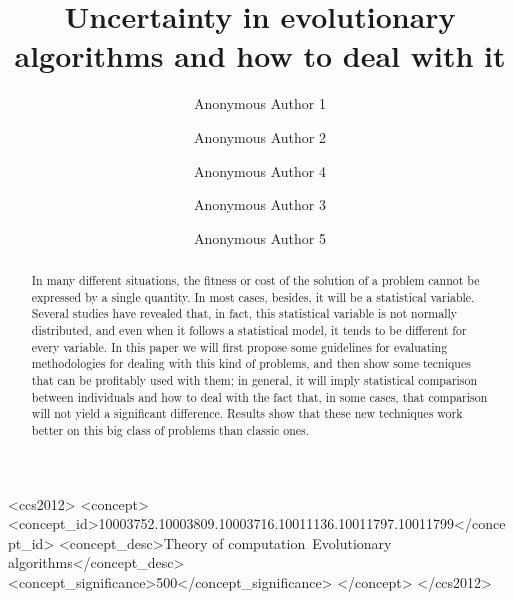 \documentclass[sigconf]{acmart}
\begin{document}
\title{Uncertainty in evolutionary algorithms and how to deal with it}

\author{Anonymous Author 1}

\author{Anonymous Author 2}

\author{Anonymous Author 4}

\author{Anonymous Author 3}

\author{Anonymous Author 5}
\renewcommand{\shortauthors}{A. Author et al.}

\begin{abstract}
  In many different situations, the fitness or cost of the solution of
  a problem cannot be expressed by a single quantity. In most cases,
  besides, it will be a statistical variable. Several studies have
  revealed that, in fact, this statistical variable is not normally
  distributed, and even when it follows a statistical model, it tends
  to be different for every variable. In this paper we will first
  propose some guidelines for evaluating methodologies for dealing
  with this kind of problems, and then show some tecniques that can be
  profitably used with them; in general, it will imply statistical
  comparison between individuals and how to deal with the fact that,
  in some cases, that comparison will not yield a significant
  difference. Results show that these new techniques work better on
  this big class of problems than classic ones. 
\end{abstract}

\begin{CCSXML}
<ccs2012>
<concept>
<concept_id>10003752.10003809.10003716.10011136.10011797.10011799</concept_id>
<concept_desc>Theory of computation~Evolutionary algorithms</concept_desc>
<concept_significance>500</concept_significance>
</concept>
</ccs2012>
\end{CCSXML}
\end{document}
